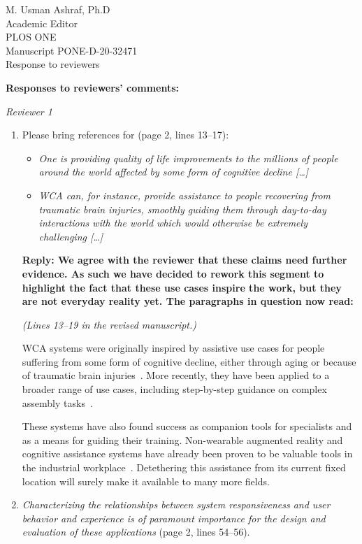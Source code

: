 \documentclass[10pt, letterpaper]{letter}
\newenvironment{QandA}
{\begin{enumerate}[
    label={\bfseries Comment \arabic*:}, 
    wide,
    ref={Comment \arabic*}]}
{\end{enumerate}}
\newenvironment{revised}[2]
{%
\begin{displayquote}
    \medskip
    \begin{flushright}
        \itshape{(Lines \numrange{#1}{#2} in the revised manuscript.)}\normalfont%
    \end{flushright}
    \medskip

}
{\end{displayquote}}
\newenvironment{answered}
{\medskip\par\bfseries Reply: \normalfont}
{\par\noindent\makebox[\linewidth]{\rule{\textwidth}{0.4pt}}\bigskip}
\begin{document}
\begin{letter}{
    M. Usman Ashraf, Ph.D\\
    Academic Editor\\
    PLOS ONE\\
    \medskip
    Manuscript PONE-D-20-32471\\
    Response to reviewers\\
}
\pagebreak

\textbf{Responses to reviewers' comments:}

\textit{Reviewer 1}
\begin{QandA}
    \item Please bring references for (page 2, lines 13--17):
    \begin{itemize}
        \item \emph{One is providing quality of life improvements to the millions of people around the world affected by some form of cognitive decline [\ldots]}
        \item \emph{WCA can, for instance, provide assistance to people recovering from traumatic brain injuries, smoothly guiding them through day-to-day interactions with the world which would otherwise be extremely challenging [\ldots]}
    \end{itemize}
    \begin{answered}
        We agree with the reviewer that these claims need further evidence.
        As such we have decided to rework this segment to highlight the fact that these use cases inspire the work, but they are not everyday reality yet.
        The paragraphs in question now read:

        \begin{revised}{13}{19}
            WCA systems were originally inspired by assistive use cases for people suffering from some form of cognitive decline, either through aging or because of traumatic brain injuries~\autocite{Ha:TowardsWearableCogAssist,satya2019augmenting}.
            More recently, they have been applied to a broader range of use cases, including step-by-step guidance on complex assembly tasks~\autocite{Chen:AnEmpiricalStudyOfLatency}.
            
            These systems have also found success as companion tools for specialists and as a means for guiding their training. 
            Non-wearable augmented reality and cognitive assistance systems have already been proven to be valuable tools in the industrial workplace~\autocite{funk2015caworkplace,gorecky2011cognito}.
            Detethering this assistance from its current fixed location will surely make it available to many more fields.
        \end{revised}
    \end{answered}

    \item \emph{Characterizing the relationships between system responsiveness and user behavior and experience is of paramount importance for the design and evaluation of these applications} (page 2, lines 54--56).
    

\end{QandA}
\end{letter}
\end{document}

